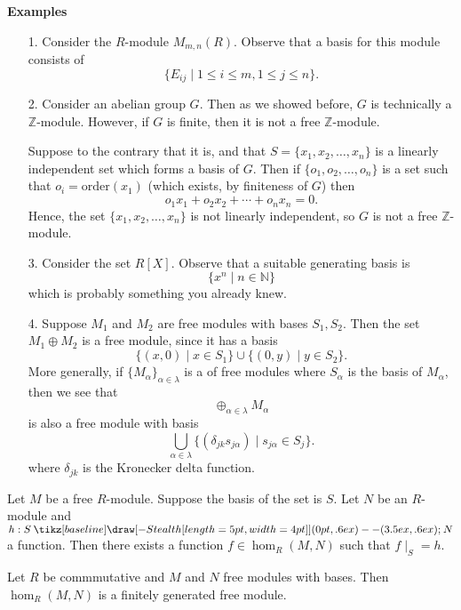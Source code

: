 \documentclass[12pt,letterpaper]{algebra_book}
\renewcommand{\to}{\mathbin{\tikz[baseline] \draw[-{Stealth[length=5pt,width=4pt]}] (0pt,.6ex) -- (3.5ex,.6ex);}}
\newcommand{\ZZ}{\mathbb{Z}}
\theoremstyle{definition}
\begin{document}
\textbf{Examples}
\begin{itemize}
    \item[1.] Consider the $R$-module $M_{m,n}(R).$ Observe that
    a basis for this module consists of 
    \[
        \{E_{ij} \mid 1 \le i \le m, 1 \le j \le n\}.
    \]

    \item[2.] Consider an abelian group $G$. Then as we showed
    before, $G$ is technically a $\mathbb{Z}$-module. However, if
    $G$ is finite, then it is not a free $\ZZ$-module. 
    
    
    Suppose to the contrary that it is, and that $S
    = \{x_1, x_2, \dots, x_n\}$ is a linearly independent set
    which forms a basis of $G$. Then if $\{o_1, o_2,
    \dots, o_n\}$ is a set such that $o_i = \text{order}(x_1)$
    (which exists, by finiteness of $G$) then  
    \[
        o_1x_1 + o_2x_2 + \cdots + o_nx_n = 0.
    \]
    Hence, the set $\{x_1, x_2, \dots, x_n\}$ is not linearly
    independent, so $G$ is not a free $\ZZ$-module.

    \item[3.] Consider the set $R[X]$. Observe that a suitable
    generating basis is 
    \[
        \{x^n \mid n \in \mathbb{N}\}
    \]
    which is probably something you already knew. 

    \item[4.] Suppose $M_1$ and $M_2$ are free modules with bases
    $S_1, S_2$. Then the set $M_1 \oplus M_2$ is a free module,
    since it has a basis 
    \[
        \{(x, 0) \mid x \in S_1\} \cup \{(0, y) \mid y \in S_2\}.
    \]
    More generally, if $\{M_\alpha\}_{\alpha \in \lambda}$ is a
    of free modules where $S_\alpha$ is the basis of $M_\alpha$,
    then we see that 
    \[
        \oplus_{\alpha \in \lambda}M_\alpha
    \]
    is also a free module with basis 
    \[
        \bigcup_{\alpha \in \lambda}\{(\delta_{jk}s_{j\alpha}) \mid s_{j\alpha} \in S_j\}.
    \]
    where $\delta_{jk}$ is the Kronecker delta function.
\end{itemize}

\begin{proposition}\label{prop: unique homomorphism}
    Let $M$ be a free $R$-module. Suppose the basis of the set is
    $S$. Let $N$ be an $R$-module and $h: S \to N$ a function.
    Then there exists a function $f \in \hom_R(M, N)$ such that
    $f\mid_S = h$. 
\end{proposition}

\begin{thm}
    Let $R$ be commmutative and $M$ and $N$ free modules with
    bases. Then $\hom_R(M, N)$ is a finitely generated free
    module. 
\end{thm}
\end{document}
